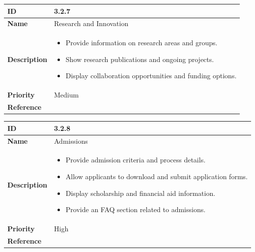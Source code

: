 \documentclass[11pt]{article}
\begin{document}
\begin{center}
\begin{tabular}{ | >{\bfseries}m{5em} | m{10cm} |  } 
  \hline
  ID & 3.2.7\\  
  \hline
  Name & Research and Innovation \\  
  \hline
  Description & 
  \begin{itemize}
      \item Provide information on research areas and groups.
      \item Show research publications and ongoing projects.
      \item Display collaboration opportunities and funding options.
  \end{itemize} \\ 
  \hline
  Priority & Medium\\
  \hline 
  Reference & \\
  \hline
\end{tabular}
\end{center}

\vspace{0.5cm}


\begin{center}
\begin{tabular}{ | >{\bfseries}m{5em} | m{10cm} |  } 
  \hline
  ID & 3.2.8\\  
  \hline
  Name & Admissions \\  
  \hline
  Description & 
  \begin{itemize}
      \item Provide admission criteria and process details.
      \item Allow applicants to download and submit application forms.
      \item Display scholarship and financial aid information.
      \item Provide an FAQ section related to admissions.
  \end{itemize} \\  
  \hline
  Priority & High\\
  \hline 
  Reference & \\
  \hline
\end{tabular}
\end{center}

\vspace{0.5cm}
\end{document}
